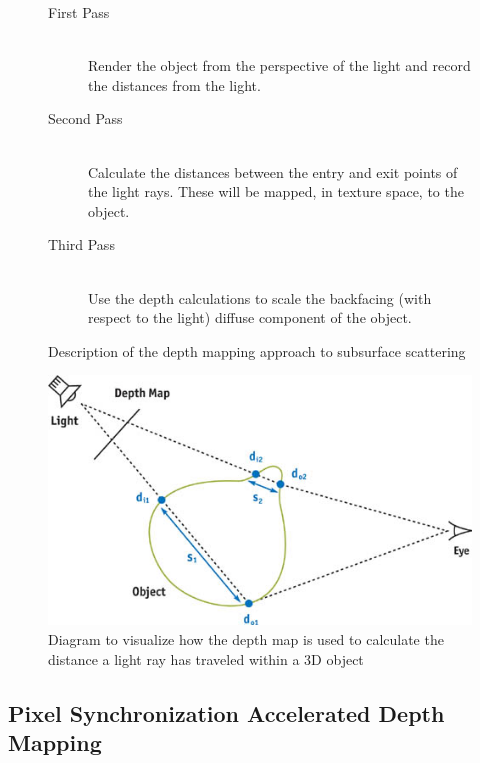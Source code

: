 \documentclass[a4paper, 12pt]{article}
\begin{document}
\begin{figure}[h]

\begin{description}

\item[First Pass] \hfill \\ Render the object from the perspective of the
light and record the distances from the light.

\item[Second Pass] \hfill \\ Calculate the distances between the entry and
exit points of the light rays. These will be mapped, in texture space, to the
object.

\item[Third Pass] \hfill \\ Use the depth calculations to scale the backfacing
(with respect to the light) diffuse component of the object.

\end{description}
\caption{Description of the depth mapping approach to subsurface scattering}
\label{figure:depthDesc}
\end{figure}

\begin{figure}[h!]
	\centering
	\includegraphics[width=1.0\textwidth]{depthMap.jpg}
	\caption{Diagram to visualize how the depth map is used to calculate the distance a light ray has traveled within a 3D object}
	\label{pic:DepthMap}
\end{figure}



\subsection{Pixel Synchronization Accelerated Depth Mapping}
\label{section:PSDepthMap}
\end{document}
